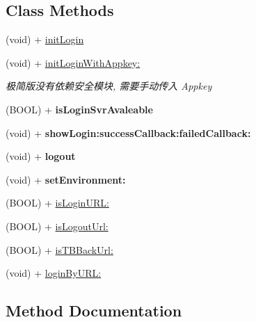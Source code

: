\subsection*{Class Methods}
\begin{DoxyCompactItemize}
\item 
(void) + \mbox{\hyperlink{interface_alibc_login_bridge_af0b710e9e6772da1cc343af8a77b8988}{init\+Login}}
\item 
(void) + \mbox{\hyperlink{interface_alibc_login_bridge_aee215752ac12eb2b672d090698a5b793}{init\+Login\+With\+Appkey\+:}}
\begin{DoxyCompactList}\small\item\em 极简版没有依赖安全模块, 需要手动传入 Appkey \end{DoxyCompactList}\item 
\mbox{\label{interface_alibc_login_bridge_a946597df9a567e8b927b39c73d7a619a}} 
(B\+O\+OL) + {\bfseries is\+Login\+Svr\+Avaleable}
\item 
\mbox{\label{interface_alibc_login_bridge_a6134fef5fe5f72c997377e5caf7a93bf}} 
(void) + {\bfseries show\+Login\+:success\+Callback\+:failed\+Callback\+:}
\item 
\mbox{\label{interface_alibc_login_bridge_ab48a29447934e31f69fb1c31e94c934f}} 
(void) + {\bfseries logout}
\item 
\mbox{\label{interface_alibc_login_bridge_a39e3c6967af87c38b5c7d622e157b44c}} 
(void) + {\bfseries set\+Environment\+:}
\item 
(B\+O\+OL) + \mbox{\hyperlink{interface_alibc_login_bridge_afb088a201b416ba86541dfe2f9c6e9da}{is\+Login\+U\+R\+L\+:}}
\item 
(B\+O\+OL) + \mbox{\hyperlink{interface_alibc_login_bridge_a6c71429da4ac9d97e103a8bb5a6141d6}{is\+Logout\+Url\+:}}
\item 
(B\+O\+OL) + \mbox{\hyperlink{interface_alibc_login_bridge_ad5d29a3e5ba45d759cfced3335baea4d}{is\+T\+B\+Back\+Url\+:}}
\item 
(void) + \mbox{\hyperlink{interface_alibc_login_bridge_a16999b3633620cdfecec73604996c179}{login\+By\+U\+R\+L\+:}}
\end{DoxyCompactItemize}


\subsection{Method Documentation}
\mbox{\label{interface_alibc_login_bridge_af0b710e9e6772da1cc343af8a77b8988}} 
